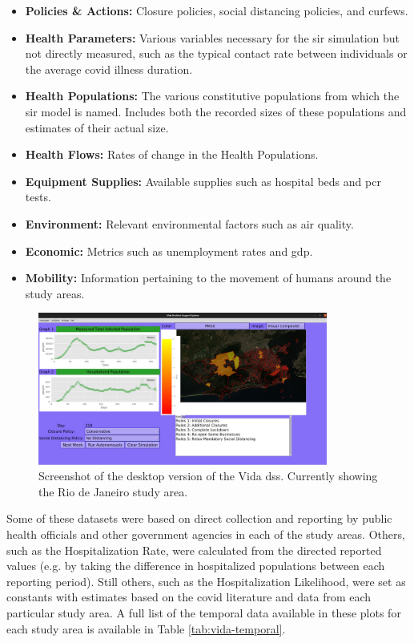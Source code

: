 \begin{itemize}[itemsep=0pt,parsep=0pt]
	\item{\textbf{Policies \& Actions:} Closure policies, social distancing policies, and curfews.}
	\item{\textbf{Health Parameters:} Various variables necessary for the \ac{sir} simulation but not directly measured, such as the typical contact rate between individuals or the average \ac{covid} illness duration.}
	\item{\textbf{Health Populations:} The various constitutive populations from which the \acl{sir} model is named. Includes both the recorded sizes of these populations and estimates of their actual size.}
	\item{\textbf{Health Flows:} Rates of change in the Health Populations.}
	\item{\textbf{Equipment Supplies:} Available supplies such as hospital beds and \ac{pcr} tests.}
	\item{\textbf{Environment:} Relevant environmental factors such as air quality.}
	\item{\textbf{Economic:} Metrics such as unemployment rates and \ac{gdp}.}
	\item{\textbf{Mobility:} Information pertaining to the movement of humans around the study areas.} 
\end{itemize}

\begin{figure}[!htb]
\centering
\includegraphics[width=0.85\textwidth]{Figures/chap5/VidaDesktopScreenshot.jpg}
\caption[Desktop Vida DSS Screenshot]{Screenshot of the desktop version of the Vida \ac{dss}. Currently showing the Rio de Janeiro study area.}
\label{fig:vidad}
\end{figure}

Some of these datasets were based on direct collection and reporting by public health officials and other government agencies in each of the study areas. Others, such as the Hospitalization Rate, were calculated from the directed reported values (e.g. by taking the difference in hospitalized populations between each reporting period). Still others, such as the Hospitalization Likelihood, were set as constants with estimates based on the \ac{covid} literature and data from each particular study area. A full list of the temporal data available in these plots for each study area is available in Table \ref{tab:vida-temporal}.

